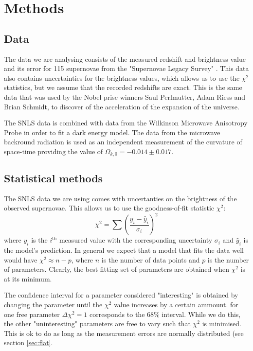 \documentclass[11pt]{article}
\begin{document}
\section{Methods}
\subsection{Data} \label{sec:data}
The data we are analysing consists of the measured redshift and brightness value and its error for 115 supernovae from the "Supernovae Legacy Survey" \cite{SN_legacy_survey}. This data also contains uncertainties for the brightness values, which allows us to use the $\chi^2$ statistics, but we assume that the recorded redshifts are exact. This is the same data that was used by the Nobel prise winners Saul Perlmutter, Adam Riess and Brian Schmidt, to discover of the acceleration of the expansion of the universe. 

The SNLS data is combined with data from the Wilkinson Microwave Anisotropy Probe \cite{WMAP} in order to fit a dark energy model. The data from the microwave backround radiation is used as an independent measurement of the curvature of space-time providing the value of $\Omega_{k,0}  = -0.014 \pm 0.017$.


\subsection{Statistical methods} \label{sec:stats}
The SNLS data we are using comes with uncertanties on the brightness of the observed supernovae. This allows us to use the goodness-of-fit statistic $\chi^2$:
\begin{equation}
	\chi^2 = \sum \left(\frac{y_i - \hat y_i}{\sigma_i}\right)^2
	\label{eq:chisq}
\end{equation}
where $y_i$ is the $i^{\mathrm{th}}$ measured value with the corresponding uncertainty $\sigma_i$ and $\hat y_i$ is the model's prediction. In general we expect that a model that fits the data well would have $\chi^2 \approx n - p$, where $n$ is the number of data points and $p$ is the number of parameters. Clearly, the best fitting set of parameters are obtained when $\chi^2$ is at its minimum. 

The confidence interval for a parameter considered "interesting" is obtained by changing the parameter until the $\chi^2$ value increases by a certain ammount. for one free parameter $\Delta \chi^2 = 1$ corresponds to the 68\% interval. While we do this, the other "uninteresting" parameters are free to vary such that $\chi^2$ is minimised. This is ok to do as long as the measurement errors are normally distributed (see section \ref{sec:flat}. 
\end{document}
